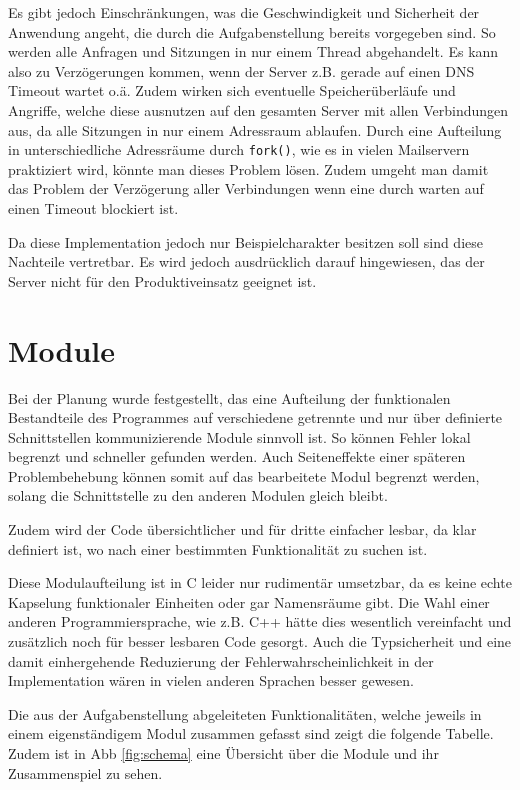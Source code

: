 \documentclass[final,a4paper,11pt,notitlepage,halfparskip]{scrreprt}
\begin{document}
Es gibt jedoch Einschränkungen, was die Geschwindigkeit und Sicherheit der 
Anwendung angeht, die durch die Aufgabenstellung bereits vorgegeben sind.
So werden alle Anfragen und Sitzungen in nur einem Thread abgehandelt. Es kann
also zu Verzögerungen kommen, wenn der Server z.B. gerade auf einen DNS 
Timeout wartet o.ä. Zudem wirken sich eventuelle Speicherüberläufe und 
Angriffe, welche diese ausnutzen auf den gesamten Server mit allen 
Verbindungen aus, da alle Sitzungen in nur einem Adressraum ablaufen.
Durch eine Aufteilung in unterschiedliche Adressräume durch \texttt{fork()}, 
wie es in vielen Mailservern praktiziert wird, könnte man dieses Problem lösen.
Zudem umgeht man damit das Problem der Verzögerung aller Verbindungen wenn eine
durch warten auf einen Timeout blockiert ist.

Da diese Implementation jedoch nur Beispielcharakter besitzen soll sind diese
Nachteile vertretbar. Es wird jedoch ausdrücklich darauf hingewiesen, das der
Server nicht für den Produktiveinsatz geeignet ist.


\section{Module}
Bei der Planung wurde festgestellt, das eine Aufteilung der funktionalen
Bestandteile des Programmes auf verschiedene getrennte und nur über definierte
Schnittstellen kommunizierende Module sinnvoll ist. So können Fehler lokal
begrenzt und schneller gefunden werden. Auch Seiteneffekte einer späteren 
Problembehebung können somit auf das bearbeitete Modul begrenzt werden, solang
die Schnittstelle zu den anderen Modulen gleich bleibt. 

Zudem wird der Code übersichtlicher und für dritte einfacher lesbar, da klar
definiert ist, wo nach einer bestimmten Funktionalität zu suchen ist.

Diese Modulaufteilung ist in C leider nur rudimentär umsetzbar, da es keine
echte Kapselung funktionaler Einheiten oder gar Namensräume gibt. Die Wahl einer
anderen Programmiersprache, wie z.B. C++ hätte dies wesentlich vereinfacht und
zusätzlich noch für besser lesbaren Code gesorgt. Auch die Typsicherheit und
eine damit einhergehende Reduzierung der Fehlerwahrscheinlichkeit in der
Implementation wären in vielen anderen Sprachen besser gewesen.

Die aus der Aufgabenstellung abgeleiteten Funktionalitäten, welche jeweils in
einem eigenständigem Modul zusammen gefasst sind zeigt die folgende Tabelle.
Zudem ist in Abb \ref{fig:schema} eine Übersicht über die Module und ihr
Zusammenspiel zu sehen.
\end{document}
